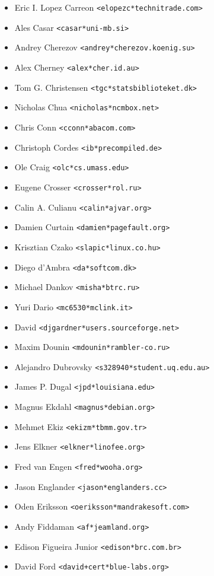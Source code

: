\documentclass[a4paper,titlepage,12pt]{article}
\newcommand{\email}[1]{\texttt{#1}}
\begin{document}
\begin{itemize}
	\item Eric I. Lopez Carreon \email{<elopezc*technitrade.com>}
	\item Ales Casar \email{<casar*uni-mb.si>}
	\item Andrey Cherezov \email{<andrey*cherezov.koenig.su>}
	\item Alex Cherney \email{<alex*cher.id.au>}
	\item Tom G. Christensen \email{<tgc*statsbiblioteket.dk>}
	\item Nicholas Chua \email{<nicholas*ncmbox.net>}
	\item Chris Conn \email{<cconn*abacom.com>}
	\item Christoph Cordes \email{<ib*precompiled.de>}
	\item Ole Craig \email{<olc*cs.umass.edu>}
	\item Eugene Crosser \email{<crosser*rol.ru>}
	\item Calin A. Culianu \email{<calin*ajvar.org>}
	\item Damien Curtain \email{<damien*pagefault.org>}
	\item Krisztian Czako \email{<slapic*linux.co.hu>}
	\item Diego d'Ambra \email{<da*softcom.dk>}
	\item Michael Dankov \email{<misha*btrc.ru>}
	\item Yuri Dario \email{<mc6530*mclink.it>}
	\item David \email{<djgardner*users.sourceforge.net>}
	\item Maxim Dounin \email{<mdounin*rambler-co.ru>}
	\item Alejandro Dubrovsky \email{<s328940*student.uq.edu.au>}
	\item James P. Dugal \email{<jpd*louisiana.edu>}
	\item Magnus Ekdahl \email{<magnus*debian.org>}
	\item Mehmet Ekiz \email{<ekizm*tbmm.gov.tr>}
	\item Jens Elkner \email{<elkner*linofee.org>}
	\item Fred van Engen \email{<fred*wooha.org>}
	\item Jason Englander \email{<jason*englanders.cc>}
	\item Oden Eriksson \email{<oeriksson*mandrakesoft.com>}
	\item Andy Fiddaman \email{<af*jeamland.org>}
	\item Edison Figueira Junior \email{<edison*brc.com.br>}
	\item David Ford \email{<david+cert*blue-labs.org>}

\end{itemize}
\end{document}
